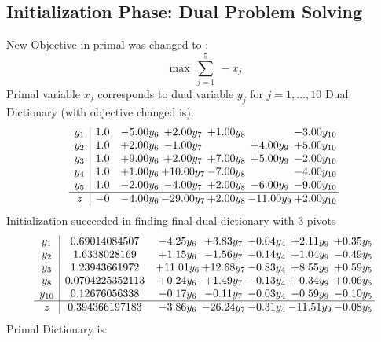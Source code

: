 \documentclass[8pt]{article}
\begin{document}
\subsection{Initialization Phase: Dual Problem Solving}
New Objective in primal was changed to : \[ \max\ \sum_{j=1}^{5}\ - x_j \] 
Primal variable $x_j$ corresponds to dual variable $y_j$ for $j = 1,\ldots,10$
Dual Dictionary (with objective changed is): 
\[\begin{array}{c| c c@{\hskip 2pt} c@{\hskip 2pt} c@{\hskip 2pt} c@{\hskip 2pt} c@{\hskip 2pt} }
 y_{1}   &  1.0 & -5.00 y_{6} & +  2.00 y_{7} & +  1.00 y_{8} &   & -3.00 y_{10}\\
 y_{2}   &  1.0 & +  2.00 y_{6} & -1.00 y_{7} &   & +  4.00 y_{9} & +  5.00 y_{10}\\
 y_{3}   &  1.0 & +  9.00 y_{6} & +  2.00 y_{7} & +  7.00 y_{8} & +  5.00 y_{9} & -2.00 y_{10}\\
 y_{4}   &  1.0 & +  1.00 y_{6} & + 10.00 y_{7} & -7.00 y_{8} &   & -4.00 y_{10}\\
 y_{5}   &  1.0 & -2.00 y_{6} & -4.00 y_{7} & +  2.00 y_{8} & -6.00 y_{9} & -9.00 y_{10}\\
\hline
z    &  -0 & -4.00 y_{6} & -29.00 y_{7} & +  2.00 y_{8} & -11.00 y_{9} & +  2.00 y_{10}\\
\end{array}\]
Initialization succeeded in finding final dual dictionary with 3 pivots
\[\begin{array}{c| c c@{\hskip 2pt} c@{\hskip 2pt} c@{\hskip 2pt} c@{\hskip 2pt} c@{\hskip 2pt} }
 y_{1}   &  0.69014084507 & -4.25 y_{6} & +  3.83 y_{7} & -0.04 y_{4} & +  2.11 y_{9} & +  0.35 y_{5}\\
 y_{2}   &  1.6338028169 & +  1.15 y_{6} & -1.56 y_{7} & -0.14 y_{4} & +  1.04 y_{9} & -0.49 y_{5}\\
 y_{3}   &  1.23943661972 & + 11.01 y_{6} & + 12.68 y_{7} & -0.83 y_{4} & +  8.55 y_{9} & +  0.59 y_{5}\\
 y_{8}   &  0.0704225352113 & +  0.24 y_{6} & +  1.49 y_{7} & -0.13 y_{4} & +  0.34 y_{9} & +  0.06 y_{5}\\
 y_{10}   &  0.12676056338 & -0.17 y_{6} & -0.11 y_{7} & -0.03 y_{4} & -0.59 y_{9} & -0.10 y_{5}\\
\hline
z    &  0.394366197183 & -3.86 y_{6} & -26.24 y_{7} & -0.31 y_{4} & -11.51 y_{9} & -0.08 y_{5}\\
\end{array}\]
Primal Dictionary is:
\end{document}

